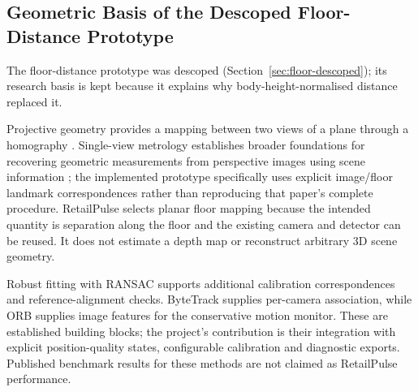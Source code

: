 \subsection{Geometric Basis of the Descoped Floor-Distance Prototype}
The floor-distance prototype was descoped (Section~\ref{sec:floor-descoped}); its research basis is kept because it explains why body-height-normalised distance replaced it.

Projective geometry provides a mapping between two views of a plane through a homography \cite{hartley2004multiple,opencvHomography}. Single-view metrology establishes broader foundations for recovering geometric measurements from perspective images using scene information \cite{criminisi2000metrology}; the implemented prototype specifically uses explicit image/floor landmark correspondences rather than reproducing that paper's complete procedure. RetailPulse selects planar floor mapping because the intended quantity is separation along the floor and the existing camera and detector can be reused. It does not estimate a depth map or reconstruct arbitrary 3D scene geometry.

Robust fitting with RANSAC \cite{fischler1981ransac} supports additional calibration correspondences and reference-alignment checks. ByteTrack \cite{zhang2022bytetrack} supplies per-camera association, while ORB \cite{rublee2011orb} supplies image features for the conservative motion monitor. These are established building blocks; the project's contribution is their integration with explicit position-quality states, configurable calibration and diagnostic exports. Published benchmark results for these methods are not claimed as RetailPulse performance.

